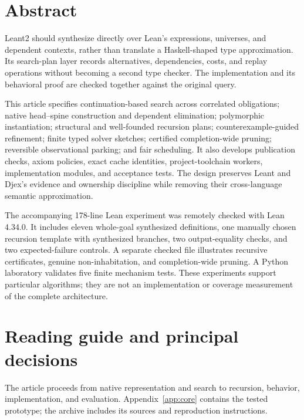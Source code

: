 \section*{Abstract}
Leant2 should synthesize directly over Lean's expressions, universes, and dependent contexts, rather than translate a Haskell-shaped type approximation. Its search-plan layer records alternatives, dependencies, costs, and replay operations without becoming a second type checker. The implementation and its behavioral proof are checked together against the original query.

This article specifies continuation-based search across correlated obligations; native head--spine construction and dependent elimination; polymorphic instantiation; structural and well-founded recursion plans; counterexample-guided refinement; finite typed solver sketches; certified completion-wide pruning; reversible observational parking; and fair scheduling. It also develops publication checks, axiom policies, exact cache identities, project-toolchain workers, implementation modules, and acceptance tests. The design preserves Leant and Djex's evidence and ownership discipline while removing their cross-language semantic approximation.

The accompanying 178-line Lean experiment was remotely checked with Lean 4.34.0. It includes eleven whole-goal synthesized definitions, one manually chosen recursion template with synthesized branches, two output-equality checks, and two expected-failure controls. A separate checked file illustrates recursive certificates, genuine non-inhabitation, and completion-wide pruning. A Python laboratory validates five finite mechanism tests. These experiments support particular algorithms; they are not an implementation or coverage measurement of the complete architecture.

\section*{Reading guide and principal decisions}
The article proceeds from native representation and search to recursion, behavior, implementation, and evaluation. Appendix~\ref{app:core} contains the tested prototype; the archive includes its sources and reproduction instructions.

